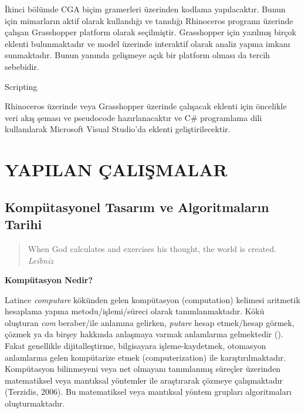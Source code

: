 \documentclass[12pt,turkish,a4paperpaper,]{report}
\begin{document}
\begin{enumerate}
  İkinci bölümde CGA biçim gramerleri üzerinden kodlama yapılacaktır.
  Bunun için mimarların aktif olarak kullandığı ve tanıdığı Rhinoceros
  programı üzerinde çalışan Grasshopper platform olarak seçilmiştir.
  Grasshopper için yazılmış birçok eklenti bulunmaktadır ve model
  üzerinde interaktif olarak analiz yapma imkanı sunmaktadır. Bunun
  yanında gelişmeye açık bir platform olması da tercih sebebidir.
\end{enumerate}

Scripting

Rhinoceros üzerinde veya Grasshopper üzerinde çalışacak eklenti için
öncelikle veri akış şeması ve pseudocode hazırlanacaktır ve C\#
programlama dili kullanılarak Microsoft Visual Studio'da eklenti
geliştirilecektir.

\hypertarget{yapilan-uxe7aliux15fmalar}{%
\chapter{YAPILAN ÇALIŞMALAR}\label{yapilan-uxe7aliux15fmalar}}

\thispagestyle{empty}

\hypertarget{kompuxfctasyonel-tasarux131m-ve-algoritmalarux131n-tarihi}{%
\section{Kompütasyonel Tasarım ve Algoritmaların
Tarihi}\label{kompuxfctasyonel-tasarux131m-ve-algoritmalarux131n-tarihi}}

\begin{quote}
When God calculates and exercises his thought, the world is created.
\emph{Leibniz}
\end{quote}

\textbf{Kompütasyon Nedir?}

Latince \emph{computare} kökünden gelen kompütasyon (computation)
kelimesi aritmetik hesaplama yapma metodu/işlemi/süreci olarak
tanımlanmaktadır. Kökü oluşturan \emph{com} beraber/ile anlamına
gelirken, \emph{putare} hesap etmek/hesap görmek, çözmek ya da birşey
hakkında anlaşmaya varmak anlamlarına gelmektedir (). Fakat genellikle
dijitalleştirme, bilgisayara işleme-kaydetmek, otomasyon anlamlarına
gelen kompütarize etmek (computerization) ile karıştırılmaktadır.
Kompütasyon bilinmeyeni veya net olmayanı tanımlanmış süreçler üzerinden
matematiksel veya mantıksal yöntemler ile araştırarak çözmeye
çalışmaktadır (Terzidis, 2006). Bu matematiksel veya mantıksal yöntem
grupları algoritmaları oluşturmaktadır.
\end{document}
